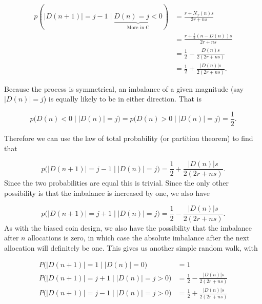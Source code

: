 \documentclass[
  openany]{book}
\theoremstyle{definition}
\theoremstyle{definition}
\theoremstyle{definition}
\theoremstyle{definition}
\theoremstyle{remark}
\begin{document}
\[
  \begin{aligned}
p\left(\lvert D\left(n+1\right)\rvert = j-1 \mid \underbrace{D\left(n\right)=j<0}_{\text{More in C}}\right) & = \frac{r + N_T\left(n\right)s}{2r + ns} \\
& = \frac{r + \frac{1}{2}\left(n - D\left(n\right)\right)s}{2r + ns} \\
& = \frac{1}{2} - \frac{D\left(n\right)s}{2\left(2r + ns\right)}\\
& = \frac{1}{2} + \frac{\lvert D\left(n\right)\rvert s}{2\left(2r + ns\right)}.
\end{aligned}
\]

Because the process is symmetrical, an imbalance of a given magnitude (say \(\lvert D\left(n\right)\rvert=j\)) is equally likely to be in either direction. That is

\[p\big(D\left(n\right) < 0 \mid \lvert D\left(n\right)\rvert =j \big)= p\big(D\left(n\right) > 0 \mid \lvert D\left(n\right)\rvert =j \big) = \frac{1}{2}.\]

Therefore we can use the law of total probability (or partition theorem) to find that

\[
  p\big(\lvert D\left(n+1\right) \rvert = j-1 \mid \lvert D\left(n\right) \rvert = j \big) = \frac{1}{2}  + \frac{\lvert D\left(n\right)\rvert s}{2\left(2r + ns\right)}.
\]
Since the two probabilities are equal this is trivial. Since the only other possibility is that the imbalance is increased by one, we also have

\[p\big(\lvert D\left(n+1\right) \rvert = j+1 \mid \lvert D\left(n\right) \rvert = j \big) = \frac{1}{2}  - \frac{\lvert D\left(n\right)\rvert s}{2\left(2r + ns\right)}. \]
As with the biased coin design, we also have the possibility that the imbalance after \(n\) allocations is zero, in which case the absolute imbalance after the next allocation will definitely be one. This gives us another simple random walk, with

\[
  \begin{aligned}
P\big(\lvert D\left(n+1\right) \rvert = 1 \mid \lvert D\left(n\right)\rvert=0\big)& = 1\\
P\big(\lvert D\left(n+1\right) \rvert = j+ 1 \mid \lvert D\left(n\right)\rvert=j>0\big)& = \frac{1}{2}  - \frac{\lvert D\left(n\right)\rvert s}{2\left(2r + ns\right)}\\
P\big(\lvert D\left(n+1\right) \rvert = j-1 \mid \lvert D\left(n\right)\rvert=j>0\big)& = \frac{1}{2}  + \frac{\lvert D\left(n\right)\rvert s}{2\left(2r + ns\right)}
\end{aligned}
\]
\end{document}
